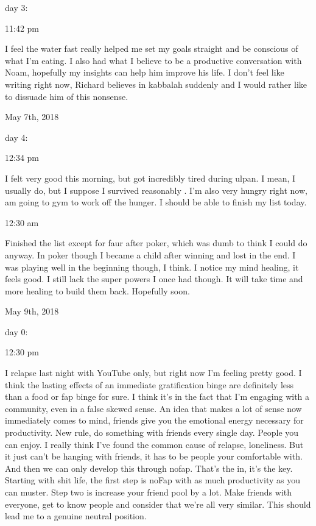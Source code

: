 day 3:

11:42 pm

I feel the water fast really helped me set my goals straight and be
conscious of what I'm eating. I also had what I believe to be a
productive conversation with Noam, hopefully my insights can help him
improve his life. I don't feel like writing right now, Richard believes
in kabbalah suddenly and I would rather like to dissuade him of this
nonsense.

\bigskip
\bigskip
May 7th, 2018

day 4:

12:34 pm

I felt very good this morning, but got incredibly tired during ulpan. I
mean, I usually do, but I suppose I survived reasonably . I'm also very
hungry right now, am going to gym to work off the hunger. I should be
able to finish my list today.

12:30 am

Finished the list except for faur after poker, which was dumb to think I
could do anyway. In poker though I became a child after winning and lost
in the end. I was playing well in the beginning though, I think. I
notice my mind healing, it feels good. I still lack the super powers I
once had though. It will take time and more healing to build them back.
Hopefully soon.

\bigskip
\bigskip
May 9th, 2018

day 0:

12:30 pm

I relapse last night with YouTube only, but right now I'm feeling pretty
good. I think the lasting effects of an immediate gratification binge
are definitely less than a food or fap binge for sure. I think it's in
the fact that I'm engaging with a community, even in a false skewed
sense. An idea that makes a lot of sense now immediately comes to mind,
friends give you the emotional energy necessary for productivity. New
rule, do something with friends every single day. People you can enjoy.
I really think I've found the common cause of relapse, loneliness. But
it just can't be hanging with friends, it has to be people your
comfortable with. And then we can only develop this through nofap.
That's the in, it's the key. Starting with shit life, the first step is
noFap with as much productivity as you can muster. Step two is increase
your friend pool by a lot. Make friends with everyone, get to know
people and consider that we're all very similar. This should lead me to
a genuine neutral position.

